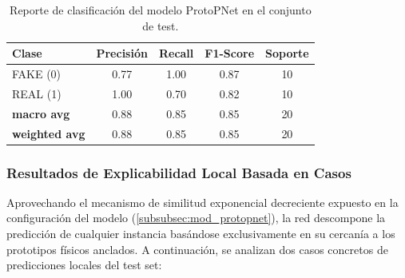 \begin{table}[h!]
\centering
\begin{tabular}{lcccc}
\toprule
\textbf{Clase} & \textbf{Precisión} & \textbf{Recall} & \textbf{F1-Score} & \textbf{Soporte} \\
\midrule
FAKE (0) & 0.77 & 1.00 & 0.87 & 10 \\
REAL (1) & 1.00 & 0.70 & 0.82 & 10 \\
\midrule
\textbf{macro avg} & 0.88 & 0.85 & 0.85 & 20 \\
\textbf{weighted avg} & 0.88 & 0.85 & 0.85 & 20 \\
\bottomrule
\end{tabular}
\caption{Reporte de clasificación del modelo ProtoPNet en el conjunto de test.}
\label{tab:metricas_protopnet}
\end{table}

\subsubsection*{Resultados de Explicabilidad Local Basada en Casos}

Aprovechando el mecanismo de similitud exponencial decreciente expuesto en la configuración del modelo (\autoref{subsubsec:mod_protopnet}), la red descompone la predicción de cualquier instancia basándose exclusivamente en su cercanía a los prototipos físicos anclados. A continuación, se analizan dos casos concretos de predicciones locales del test set:

